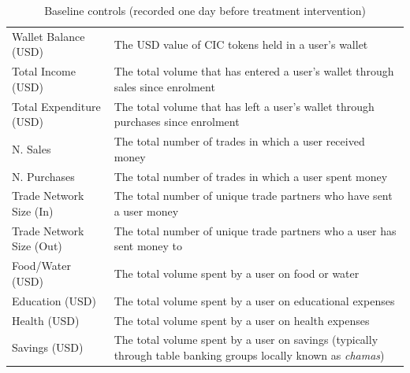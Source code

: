 \documentclass[12pt]{article}
\begin{document}
\begin{table}[h]
    \centering
    \caption{Baseline controls (recorded one day before treatment intervention)}
    \label{tab:tab2}
    \begin{tabular}{p{2in}p{4in}} \hline
    Wallet Balance (USD) & The USD value of CIC tokens held in a user's wallet \\
    Total Income (USD) & The total volume that has entered a user's wallet through sales since enrolment \\
    Total Expenditure (USD) & The total volume that has left a user's wallet through purchases since enrolment \\
    N. Sales & The total number of trades in which a user received money \\
    N. Purchases & The total number of trades in which a user spent money \\
    Trade Network Size (In) & The total number of unique trade partners who have sent a user money \\
    Trade Network Size (Out) & The total number of unique trade partners who a user has sent money to \\
    Food/Water (USD) & The total volume spent by a user on food or water \\
    Education (USD) & The total volume spent by a user on educational expenses \\
    Health (USD) & The total volume spent by a user on health expenses \\
    Savings (USD) & The total volume spent by a user on savings (typically through table banking groups locally known as \textit{chamas}) \\ \hline
    \end{tabular}
\end{table}
\end{document}
